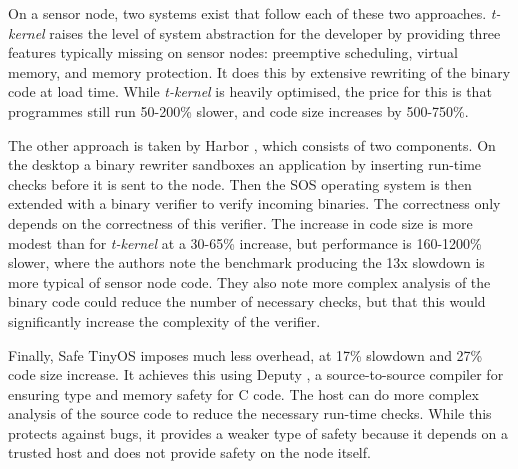 On a sensor node, two systems exist that follow each of these two approaches. \emph{t-kernel} \cite{Gu:2006ww} raises the level of system abstraction for the developer by providing three features typically missing on sensor nodes: preemptive scheduling, virtual memory, and memory protection. It does this by extensive rewriting of the binary code at load time. While \emph{t-kernel} is heavily optimised, the price for this is that programmes still run 50-200\% slower, and code size increases by 500-750\%.

The other approach is taken by Harbor \cite{Kumar:2007ge}, which consists of two components. On the desktop a binary rewriter sandboxes an application by inserting run-time checks before it is sent to the node. Then the SOS operating system is then extended with a binary verifier to verify incoming binaries. The correctness only depends on the correctness of this verifier. The increase in code size is more modest than for \emph{t-kernel} at a 30-65\% increase, but performance is 160-1200\% slower, where the authors note the benchmark producing the 13x slowdown is more typical of sensor node code. They also note more complex analysis of the binary code could reduce the number of necessary checks, but that this would significantly increase the complexity of the verifier.

Finally, Safe TinyOS \cite{Cooprider:2007ub} imposes much less overhead, at 17\% slowdown and 27\% code size increase. It achieves this using Deputy \cite{Condit:2007uo}, a source-to-source compiler for ensuring type and memory safety for C code. The host can do more complex analysis of the source code to reduce the necessary run-time checks. While this protects against bugs, it provides a weaker type of safety because it depends on a trusted host and does not provide safety on the node itself.
